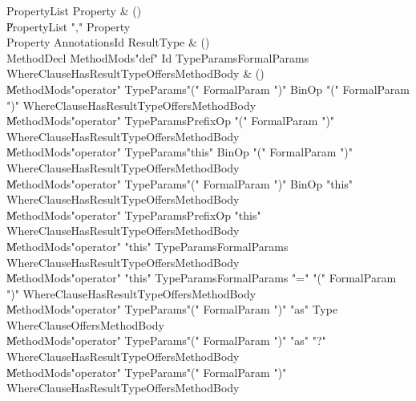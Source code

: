 \begin{bbgrammar}

 PropertyList  \label{prod:PropertyList}  \: Property & ()\\
    \| PropertyList \xcd"," Property\\
 Property  \label{prod:Property}  \: Annotations\opt Id ResultType & ()\\
 MethodDecl  \label{prod:MethodDecl}  \: MethodMods\opt \xcd"def" Id TypeParams\opt FormalParams WhereClause\opt HasResultType\opt Offers\opt MethodBody & ()\\
    \| MethodMods\opt \xcd"operator" TypeParams\opt \xcd"(" FormalParam  \xcd")" BinOp \xcd"(" FormalParam  \xcd")" WhereClause\opt HasResultType\opt Offers\opt MethodBody\\
    \| MethodMods\opt \xcd"operator" TypeParams\opt PrefixOp \xcd"(" FormalParam  \xcd")" WhereClause\opt HasResultType\opt Offers\opt MethodBody\\
    \| MethodMods\opt \xcd"operator" TypeParams\opt \xcd"this" BinOp \xcd"(" FormalParam  \xcd")" WhereClause\opt HasResultType\opt Offers\opt MethodBody\\
    \| MethodMods\opt \xcd"operator" TypeParams\opt \xcd"(" FormalParam  \xcd")" BinOp \xcd"this" WhereClause\opt HasResultType\opt Offers\opt MethodBody\\
    \| MethodMods\opt \xcd"operator" TypeParams\opt PrefixOp \xcd"this" WhereClause\opt HasResultType\opt Offers\opt MethodBody\\
    \| MethodMods\opt \xcd"operator" \xcd"this" TypeParams\opt FormalParams WhereClause\opt HasResultType\opt Offers\opt MethodBody\\
    \| MethodMods\opt \xcd"operator" \xcd"this" TypeParams\opt FormalParams \xcd"=" \xcd"(" FormalParam  \xcd")" WhereClause\opt HasResultType\opt Offers\opt MethodBody\\
    \| MethodMods\opt \xcd"operator" TypeParams\opt \xcd"(" FormalParam  \xcd")" \xcd"as" Type WhereClause\opt Offers\opt MethodBody\\
    \| MethodMods\opt \xcd"operator" TypeParams\opt \xcd"(" FormalParam  \xcd")" \xcd"as" \xcd"?" WhereClause\opt HasResultType\opt Offers\opt MethodBody\\
    \| MethodMods\opt \xcd"operator" TypeParams\opt \xcd"(" FormalParam  \xcd")" WhereClause\opt HasResultType\opt Offers\opt MethodBody\\

\end{bbgrammar}
